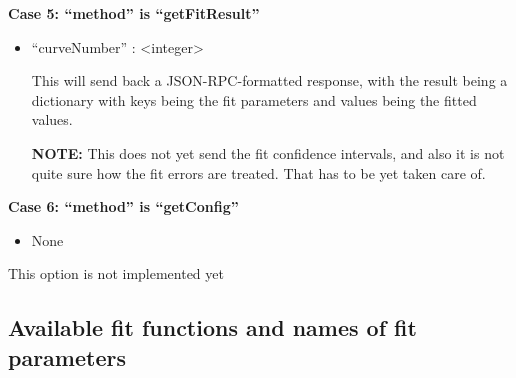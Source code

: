 \documentclass[11pt]{article} %
\begin{document}
\begin{tcolorbox}[breakable,title=Sending ``params'' to the server]
\textbf{Case 5: ``method'' is ``getFitResult''}

\begin{itemize}
\item ``curveNumber'' : <integer>

This will send back a JSON-RPC-formatted response, with the result being a dictionary with keys being the fit parameters and values being the fitted values. 

\textbf{NOTE:} This does not yet send the fit confidence intervals, and also it is not quite sure how the fit errors are treated. That has to be yet taken care of. 


\end{itemize}

\textbf{Case 6: ``method'' is ``getConfig''}

\begin{itemize}
\item None
\end{itemize}

This option is not implemented yet 

\end{tcolorbox}

\subsection{Available fit functions and names of fit parameters} \label{AvailableFitFunctions}



 

\end{document}
